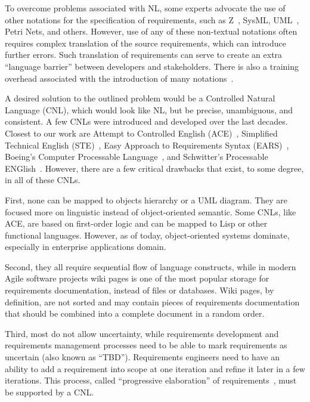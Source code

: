 \documentclass[sigplan,10pt,nonacm=true]{acmart}
\newcommand{\nospell}[1]{#1}
\begin{document}
To overcome problems associated with NL, some experts advocate the use of
other notations for the specification of requirements, such as
Z~\citep{woodcock96}, SysML, UML~\citep{uml}, Petri Nets, and others. However,
use of any of these non-textual notations often requires complex translation
of the source requirements, which can introduce further errors. Such
translation of requirements can serve to create an extra ``language
barrier'' between developers and stakeholders. There is also a training
overhead associated with the introduction of many notations~\citep{ears09}.

A desired solution to the outlined problem would be a Controlled Natural
Language (CNL), which would look like NL, but be precise,
unambiguous, and consistent. A few CNLs were introduced and developed over
the last decades. Closest to our work are Attempt to Controlled English
(ACE)~\citep{ace06}, Simplified Technical English (STE)~\citep{ste05}, Easy
Approach to Requirements Syntax (EARS)~\citep{ears09}, Boeing's Computer
Processable Language~\citep{clark05}, and \nospell{Schwitter's Processable
ENGlish}~\citep{peng}. However, there are a few critical drawbacks that exist,
to some degree, in all of these CNLs.

First, none can be mapped to objects hierarchy or a UML diagram.
They are focused more on linguistic instead of object-oriented semantic.
Some CNLs, like ACE, are based on first-order logic and can be mapped to
Lisp or other functional languages. However, as of today, object-oriented
systems dominate, especially in enterprise applications domain.

Second, they all require sequential flow of language constructs, while in
modern Agile software projects wiki pages is one of the most popular storage for
requirements documentation, instead of files or databases. Wiki pages, by
definition, are not sorted and may contain pieces of requirements
documentation that should be combined into a complete document in a random
order.

Third, most do not allow uncertainty, while requirements development
and requirements management processes need to be able to mark
requirements as uncertain (also known as ``TBD''). Requirements engineers
need to have an ability to add a requirement into scope at one iteration
and refine it later in a few iterations. This process, called ``progressive
elaboration'' of requirements~\citep{pmbok4}, must be supported by a CNL.
\end{document}
